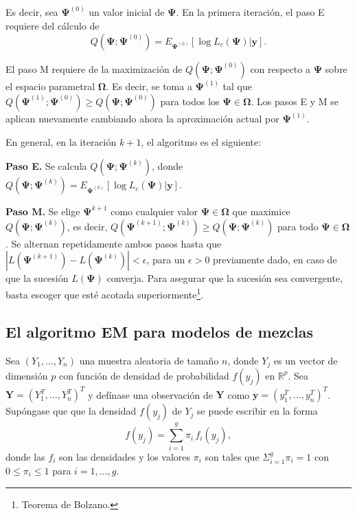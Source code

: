 \documentclass[
]{article}
\begin{document}
Es decir, sea \(\bm{\Psi}^{(0)}\) un valor inicial de \(\bm{\Psi}\). En
la primera iteración, el paso E requiere del cálculo de
\[ Q( \bm{\Psi};\bm{\Psi}^{(0)})=E_{\bm{\Psi}^{(0)}} [\log L_c(\bm{\Psi})|\bm{y}].\]

El paso M requiere de la maximización de
\(Q( \bm{\Psi};\bm{\Psi}^{(0)})\) con respecto a \(\bm{\Psi}\) sobre el
espacio parametral \(\bm{\Omega}\). Es decir, se toma a
\(\bm{\Psi}^{(1)}\) tal que
\(Q( \bm{\Psi}^{(1)};\bm{\Psi}^{(0)}) \ge Q( \bm{\Psi};\bm{\Psi}^{(0)})\)
para todos los \(\bm{\Psi} \in \bm{\Omega}\). Los pasos E y M se aplican
nuevamente cambiando ahora la aproximación actual por
\(\bm{\Psi}^{(1)}\).

En general, en la iteración \(k+1\), el algoritmo es el siguiente:

\textbf{Paso E.} Se calcula \(Q( \bm{\Psi};\bm{\Psi}^{(k)})\), donde
\(Q( \bm{\Psi};\bm{\Psi}^{(k)})=E_{\bm{\Psi}^{(k)}} [\log L_c(\bm{\Psi})|\bm{y}]\).

\textbf{Paso M.} Se elige \(\bm{\Psi}^{k+1}\) como cualquier valor
\(\bm{\Psi} \in \bm{\Omega}\) que maximice
\(Q( \bm{\Psi};\bm{\Psi}^{(k)})\), es decir,
\(Q( \bm{\Psi}^{(k+1)};\bm{\Psi}^{(k)}) \ge Q( \bm{\Psi};\bm{\Psi}^{(k)})\)
para todo \(\bm{\Psi} \in \bm{\Omega}\). Se alternan repetidamente ambos
pasos hasta que \(|L(\bm{\Psi}^{(k+1)})-L(\bm{\Psi}^{(k)})|<\epsilon\),
para un \(\epsilon>0\) previamente dado, en caso de que la sucesión
\({L(\bm{\Psi})}\) converja. Para asegurar que la sucesión sea
convergente, basta escoger que esté acotada
superiormente\footnote{Teorema de Bolzano.}.

\subsection{El algoritmo EM para modelos de mezclas}

Sea \((Y_1,\ldots,Y_n)\) una muestra aleatoria de tamaño \(n\), donde
\(Y_j\) es un vector de dimensión \(p\) con función de densidad de
probabilidad \(f(y_j)\) en \(\mathbb{R}^p\). Sea
\(\bm{Y}=(Y_1^T,\ldots,Y_n^T)^T\) y defínase una observación de
\(\bm{Y}\) como \(\bm{y}=(y_1^T,\ldots,y_n^T)^T\). Supóngase que que la
densidad \(f(y_j)\) de \(Y_j\) se puede escribir en la forma
\begin{equation}
f(y_j) = \sum_{i=1}^{g} \pi_i \, f_i (y_j),\label{mezcla}
\end{equation} donde las \(f_i\) son las densidades y los valores
\(\pi_i\) son tales que \(\Sigma_{i=1}^{g} \pi_i=1\) con
\(0 \le \pi_i \le 1\) para \(i=1,\ldots,g\).
\end{document}
